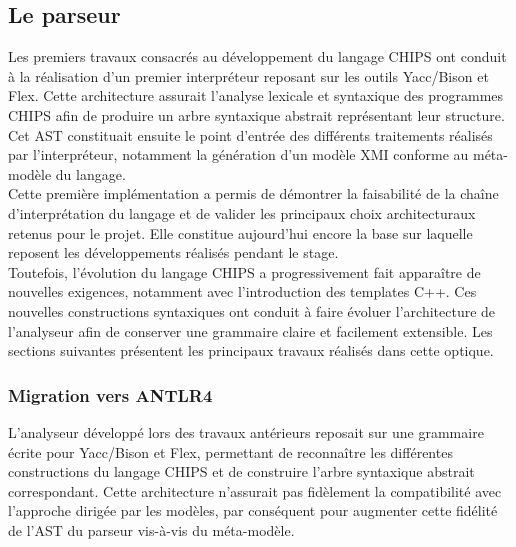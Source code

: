 
\subsection{Le parseur}
\label{sec:parseur}

Les premiers travaux consacrés au développement du langage CHIPS ont conduit à la réalisation d'un premier interpréteur reposant sur les outils Yacc/Bison et Flex. Cette architecture assurait l'analyse lexicale et syntaxique des programmes CHIPS afin de produire un arbre syntaxique abstrait représentant leur structure. Cet AST constituait ensuite le point d'entrée des différents traitements réalisés par l'interpréteur, notamment la génération d'un modèle XMI conforme au méta-modèle du langage. \\

Cette première implémentation a permis de démontrer la faisabilité de la chaîne d'interprétation du langage et de valider les principaux choix architecturaux retenus pour le projet. Elle constitue aujourd'hui encore la base sur laquelle reposent les développements réalisés pendant le stage. \\

Toutefois, l'évolution du langage CHIPS a progressivement fait apparaître de nouvelles exigences, notamment avec l'introduction des templates C++. Ces nouvelles constructions syntaxiques ont conduit à faire évoluer l'architecture de l'analyseur afin de conserver une grammaire claire et facilement extensible. Les sections suivantes présentent les principaux travaux réalisés dans cette optique. \\

\subsubsection{Migration vers ANTLR4}
\label{sec:migration_antlr4}

L'analyseur développé lors des travaux antérieurs reposait sur une grammaire écrite pour Yacc/Bison et Flex, 
permettant de reconnaître les différentes constructions du langage CHIPS et de construire l'arbre syntaxique 
abstrait correspondant. Cette architecture n'assurait pas fidèlement la compatibilité avec l'approche dirigée par les modèles, par conséquent 
pour augmenter cette fidélité de l'AST du parseur vis-à-vis du méta-modèle.


